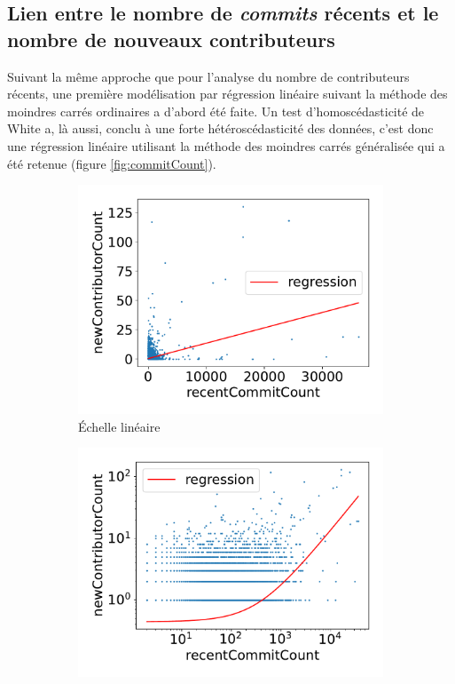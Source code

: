 \documentclass[dvipsnames]{llncs}
\newcommand{\en}[1]{\foreignlanguage{english}{\emph{#1}}}
\begin{document}
    \subsection{Lien entre le nombre de \en{commits} récents et le nombre de nouveaux contributeurs}

    Suivant la même approche que pour l'analyse du nombre de contributeurs récents, une première modélisation
    par régression linéaire suivant la méthode des moindres carrés ordinaires a d'abord été faite. Un test
    d'homoscédasticité de White a, là aussi, conclu à une forte hétéroscédasticité des données, c'est donc une
    régression linéaire utilisant la méthode des moindres carrés généralisée qui a été retenue (figure
    \ref{fig:commitCount}).

    \begin{figure}[ht]
        \centering
        \begin{subfigure}[t]{0.5\textwidth}
            \includegraphics[width=\textwidth]{../experiment/data_analysis/recentCommitCountRegression_linearScale}
            \caption{Échelle linéaire}
        \end{subfigure}%
        \begin{subfigure}[t]{0.5\textwidth}
            \includegraphics[width=\textwidth]{../experiment/data_analysis/recentCommitCountRegression_logScale}

\end{subfigure}
\end{figure}
\end{document}
